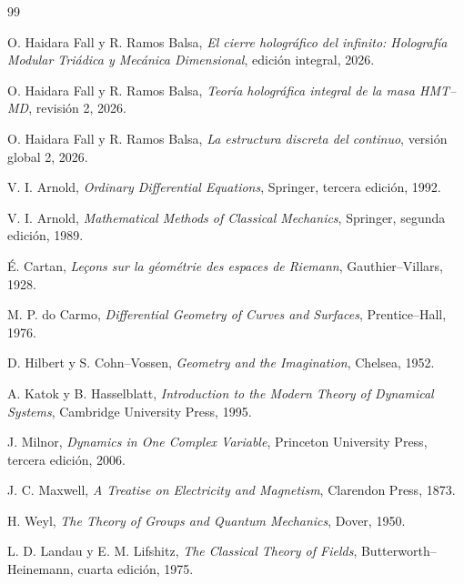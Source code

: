 \renewcommand{\bibname}{Referencias de las correspondencias espirales genealógicas}
\begin{thebibliography}{99}

O. Haidara Fall y R. Ramos Balsa,
\emph{El cierre holográfico del infinito: Holografía Modular Triádica y
Mecánica Dimensional}, edición integral, 2026.

O. Haidara Fall y R. Ramos Balsa,
\emph{Teoría holográfica integral de la masa HMT--MD}, revisión 2, 2026.

O. Haidara Fall y R. Ramos Balsa,
\emph{La estructura discreta del continuo}, versión global 2, 2026.

V. I. Arnold,
\emph{Ordinary Differential Equations},
Springer, tercera edición, 1992.

V. I. Arnold,
\emph{Mathematical Methods of Classical Mechanics},
Springer, segunda edición, 1989.

É. Cartan,
\emph{Leçons sur la géométrie des espaces de Riemann},
Gauthier--Villars, 1928.

M. P. do Carmo,
\emph{Differential Geometry of Curves and Surfaces},
Prentice--Hall, 1976.

D. Hilbert y S. Cohn--Vossen,
\emph{Geometry and the Imagination},
Chelsea, 1952.

A. Katok y B. Hasselblatt,
\emph{Introduction to the Modern Theory of Dynamical Systems},
Cambridge University Press, 1995.

J. Milnor,
\emph{Dynamics in One Complex Variable},
Princeton University Press, tercera edición, 2006.

J. C. Maxwell,
\emph{A Treatise on Electricity and Magnetism},
Clarendon Press, 1873.

H. Weyl,
\emph{The Theory of Groups and Quantum Mechanics},
Dover, 1950.

L. D. Landau y E. M. Lifshitz,
\emph{The Classical Theory of Fields},
Butterworth--Heinemann, cuarta edición, 1975.

\end{thebibliography}
